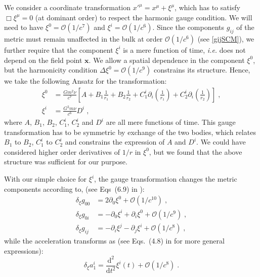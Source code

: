 \documentclass[
superscriptaddress,
preprint,
prd,tightenlines,showpacs,nofootinbib,
eqsecnum,
amsfonts,amsmath,amssymb]{revtex4-1}
\newcommand{\ud}{\mathrm{d}}
\begin{document}
We consider a coordinate transformation $x'^{\mu} = x^{\mu} +
\xi^{\mu}$, which has to satisfy $\Box \xi^{\mu} = 0$ (at dominant
order) to respect the harmonic gauge condition. We will need to have
$\xi^{0}=\mathcal{O}(1/c^{7})$ and
$\xi^{i}=\mathcal{O}(1/c^{6})$. Since the components $g_{ij}$ of the
metric must remain unaffected in the bulk at order
$\mathcal{O}(1/c^{6})$ (see \eqref{gijSCM}), we further require that
the component $\xi^{i}$ is a mere function of time, \textit{i.e.} does
not depend on the field point $\mathbf{x}$. We allow a spatial
dependence in the component $\xi^{0}$, but the harmonicity condition
$\Delta \xi^{0} = \mathcal{O}(1/c^{9})$ constrains its
structure. Hence, we take the following Ansatz for the transformation:
\begin{subequations}\label{eq:gaugeAnsatz}
\begin{align}
  \xi^{0} &= \frac{Gm^{2}\nu}{c^{7}}\left[ A + B_{1}\frac{1}{r_{1}} + B_{2}\frac{1}{r_{2}} + C_{1}^{i}\partial_{i}\left(\frac{1}{r_{1}}\right) + C_{2}^{i}\partial_{i}\left(\frac{1}{r_{2}}\right)\right] \;, \\
  \xi^{i} &= \frac{G^{2}m\nu}{c^{6}} D^{i} \; ,
\end{align}
\end{subequations}
where $A$, $B_{1}$, $B_{2}$, $C_{1}^{i}$, $C_{2}^{i}$ and $D^{i}$ are
all mere functions of time. This gauge transformation has to be
symmetric by exchange of the two bodies, which relates $B_{1}$ to
$B_{2}$, $C_{1}^{i}$ to $C_{2}^{i}$ and constrains the expression of
$A$ and $D^{i}$. We could have considered higher order derivatives of
$1/r$ in $\xi^{0}$, but we found that the above structure was
sufficient for our purpose.

With our simple choice for $\xi^{i}$, the gauge transformation changes the metric components according to,
 (see Eqs~(6.9) in
\cite{Blanchet2001a}):
\begin{subequations} \label{eq:gaugetrans}
  \begin{align}
    \delta_{\xi}g_{00} &= 2 \partial_{0}\xi^{0} + \mathcal{O}(1/c^{10}) \; , \\
    \delta_{\xi}g_{0i} &= - \partial_{0}\xi^{i} + \partial_{i}\xi^{0} + \mathcal{O}(1/c^{9}) \; , \\
    \delta_{\xi}g_{ij} &= - \partial_{i}\xi^{j} - \partial_{j}\xi^{i}
    + \mathcal{O}(1/c^{8}) \; ,
\end{align}
\end{subequations}
while the acceleration transforms as (see Eqs.~(4.8) in
\cite{Arun2008} for more general expressions):
\begin{equation}
  \delta_{\xi}a_{1}^{i} = \frac{\ud^{2}}{\ud t^{2}} \xi^{i}(t) + \mathcal{O}(1/c^{8}) \; .
\end{equation}
\end{document}

